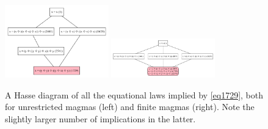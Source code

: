 \begin{figure}
    \centering
    \includegraphics[width=0.4\textwidth]{ramanujan-infinite.png}
    \includegraphics[width=0.4\textwidth]{ramanujan-finite.png}
    \caption{A Hasse diagram of all the equational laws implied by \eqref{eq1729}, both for unrestricted magmas (left) and finite magmas (right). Note the slightly larger number of implications in the latter.}
    \label{fig:1729}
\end{figure}


